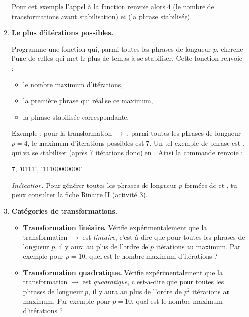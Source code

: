 \documentclass[11pt,class=report,crop=false]{standalone}
\begin{document}
\begin{activite}
\begin{enumerate}
Pour cet exemple l'appel à la fonction  renvoie alors $4$ (le nombre de transformations avant stabilisation) et  (la phrase stabilisée).

	\item \textbf{Le plus d'itérations possibles.}
	
	Programme une fonction  
qui, parmi toutes les phrases de longueur $p$, cherche l'une de celles qui met le plus de temps à se stabiliser. Cette fonction renvoie :
\begin{itemize}
  \item le nombre maximum d'itérations,
  \item la première phrase qui réalise ce maximum,
  \item la phrase stabilisée correspondante.
\end{itemize}

Exemple : pour la transformation \rzero\run{} $\rightarrow$ \run\rzero\rzero, parmi toutes les phrases de longueur $p=4$, le maximum d'itérations possibles est $7$. Un tel exemple de phrase est \rzero\run\run\run, qui va se stabiliser (après 7 itérations donc) en \run\run\run\rzero\rzero\rzero\rzero\rzero\rzero\rzero\rzero.
Ainsi la commande  renvoie : \\
\centerline{7, '0111', '11100000000'}


  \emph{Indication.} Pour générer toutes les phrases de longueur $p$ formées de \rzero{} et \run{}, tu peux consulter la fiche \og{}Binaire II\fg{} (activité 3).

	\item \textbf{Catégories de transformations.}
	
	\begin{itemize} 
	\item \textbf{Transformation linéaire.}
	Vérifie expérimentalement que la transformation \rzero\rzero\run\run{} $\rightarrow$ \run\run\rzero{} est \emph{linéaire}, c'est-à-dire que pour toutes les phrases de longueur $p$, il y aura au plus de l'ordre de $p$ itérations au maximum. Par exemple pour $p=10$, quel est le nombre maximum d'itérations  ?
	
	\item \textbf{Transformation quadratique.}
	Vérifie expérimentalement que la transformation \rzero\run{} $\rightarrow$ \run\rzero{} est \emph{quadratique}, c'est-à-dire que pour toutes les phrases de longueur $p$, il y aura au plus de l'ordre de $p^2$ itérations au maximum. Par exemple pour $p=10$, quel est le nombre maximum d'itérations  ?
	

\end{itemize}
\end{enumerate}
\end{activite}
\end{document}
